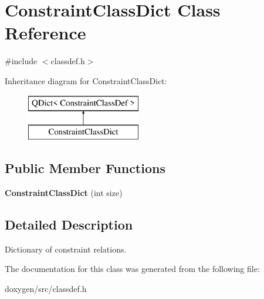 \hypertarget{class_constraint_class_dict}{}\section{Constraint\+Class\+Dict Class Reference}
\label{class_constraint_class_dict}


{\ttfamily \#include $<$classdef.\+h$>$}

Inheritance diagram for Constraint\+Class\+Dict\+:\begin{figure}[H]
\begin{center}
\leavevmode
\includegraphics[height=2.000000cm]{class_constraint_class_dict}
\end{center}
\end{figure}
\subsection*{Public Member Functions}
\begin{DoxyCompactItemize}
\item 
\mbox{\label{class_constraint_class_dict_a6cc0e38f89b4260858ab276addd0db46}} 
{\bfseries Constraint\+Class\+Dict} (int size)
\end{DoxyCompactItemize}


\subsection{Detailed Description}
Dictionary of constraint relations. 

The documentation for this class was generated from the following file\+:\begin{DoxyCompactItemize}
\item 
doxygen/src/classdef.\+h\end{DoxyCompactItemize}
